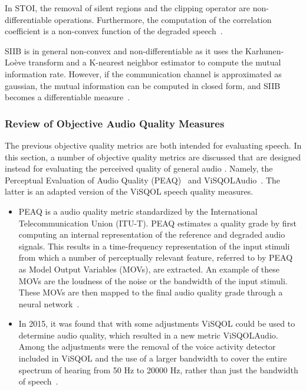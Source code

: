 In STOI, the removal of silent regions and the clipping operator are non-differentiable operations.
Furthermore, the computation of the correlation coefficient is a non-convex function of the degraded speech~\cite{taal2011algorithm}.

SIIB is in general non-convex and non-differentiable as it uses the Karhunen-Lo\`eve transform and a 
K-nearest neighbor estimator to compute the mutual information rate.
However, if the communication channel is approximated as gaussian, the mutual information can be computed in closed form,
and SIIB becomes a differentiable measure~\cite{van2017instrumental}.

\subsubsection{Review of Objective Audio Quality Measures}
The previous objective quality metrics are both intended for evaluating speech.
In this section, a number of objective quality metrics are discussed that are designed instead 
for evaluating the perceived quality of general audio .
Namely, the Perceptual Evaluation of Audio Quality (PEAQ)~\cite{thiede2000peaq} 
and ViSQOLAudio~\cite{hines2015visqolaudio}.
The latter is an adapted version of the ViSQOL speech quality measures.

\begin{itemize}
    \item 
PEAQ is a audio quality metric standardized by the International Telecommunication Union (ITU-T).
PEAQ estimates a quality grade by first computing an internal representation  of
the reference and degraded audio signals.
This results in a time-frequency representation of the input stimuli from which a number of perceptually relevant feature,
referred to by PEAQ as Model Output Variables (MOVs), are extracted.
An example of these MOVs are the loudness of the noise or the bandwidth of the input stimuli.
These MOVs are then mapped to the final audio quality grade through a neural network~\cite{thiede2000peaq}.
    \item 
In 2015, it was found that with some adjustments ViSQOL could be used to determine audio quality, which resulted in a 
new metric ViSQOLAudio.
Among the adjustments were the removal of the voice activity detector included in ViSQOL and the use of a larger bandwidth
to cover the entire spectrum of hearing from 50 Hz to 20000 Hz, rather than just the bandwidth of speech~\cite{hines2015visqolaudio}.
\end{itemize}

